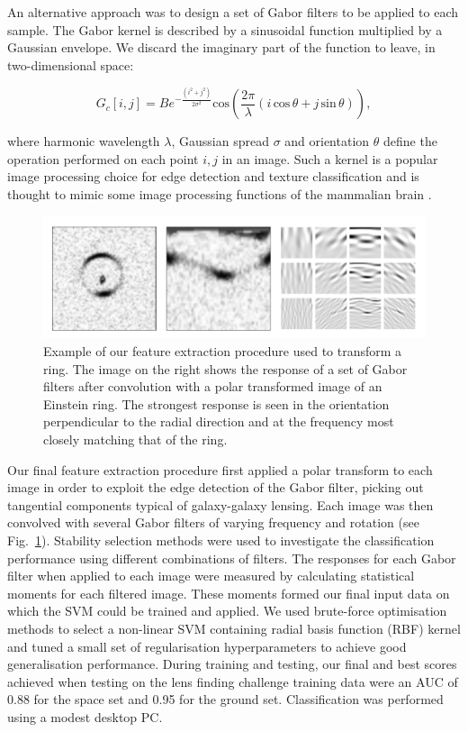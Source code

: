\documentclass[useAMS,usenatbib]{mnras}
\begin{document}
An alternative approach was to design a set of Gabor filters to be applied to each sample. The Gabor kernel is described by a sinusoidal function multiplied by a Gaussian envelope. We discard the imaginary part of the function to leave, in two-dimensional space:

\begin{equation}
G_c[i,j]=Be^{-\frac{(i^2+j^2)}{2\sigma^2}} \mathrm{cos}\left(\frac{2\pi}{\lambda} (i\, \mathrm{cos} \, \theta + j\, \mathrm{sin} \,\theta)\right),
\end{equation}

where harmonic wavelength $\lambda$, Gaussian spread  $\sigma$ and orientation $\theta$ define the operation performed on each point $i,j$ in an image. Such a kernel is a popular image processing choice for edge detection and texture classification \citep[e.g.][]{Feichtinger98a,Springer-verlag97computationalmodels} and is thought to mimic some image processing functions of the mammalian brain \citep{Jones1233}.


\begin{figure}
  \centering
      \includegraphics[width=1\columnwidth]{figures/polarfilter.pdf} 
  \caption{Example of our feature extraction procedure used to transform a ring. The image on the right shows the response of a set of Gabor filters after convolution with a polar transformed image of an Einstein ring. The strongest response is seen in the orientation perpendicular to the radial direction and at the frequency most closely matching that of the ring.}
 \label{gaborring}
\end{figure}

Our final feature extraction procedure first applied a polar transform to each image in order to exploit the edge detection of the Gabor filter, picking out tangential components typical of galaxy-galaxy lensing. Each image was then convolved with several Gabor filters of varying frequency and rotation (see Fig.~\ref{gaborring}). Stability selection methods were used to investigate the classification performance using different combinations of filters. The responses for each Gabor filter when applied to each image were measured by calculating statistical moments for each filtered image. These moments formed  our final input data on which the SVM could be trained and applied. We used brute-force optimisation methods to select a non-linear SVM containing radial basis function (RBF) kernel and tuned a small set of regularisation hyperparameters to achieve good generalisation performance. During training and testing, our final and best scores achieved when testing on the lens finding challenge training data were an AUC of 0.88 for the space set and 0.95 for the ground set. Classification was performed using a modest desktop PC.
\end{document}
